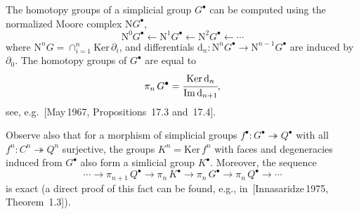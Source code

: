 \documentclass[oneside, 11pt]{amsart}
\begin{document}
The homotopy groups of a simplicial group $G^\bullet$ can be computed using the normalized Moore complex $\mathrm NG^\bullet$,
$$
\mathrm N^0G^\bullet\leftarrow\mathrm N^1G^\bullet\leftarrow\mathrm N^2G^\bullet\leftarrow\cdots
$$
where $\mathrm N^nG=\cap_{i=1}^n\mathrm{Ker}\,\partial_i$, and differentials $\mathrm d_n\colon\mathrm N^{n}G^\bullet\rightarrow\mathrm N^{n-1}G^\bullet$ are induced by $\partial_0$. The homotopy groups of $G^\bullet$ are equal to
$$
\pi_n\,G^\bullet = \cfrac{\mathrm{Ker}\,\mathrm d_n}{\mathrm{Im}\,\mathrm d_{n+1}},
$$
see, e.g.~[May\,1967, Propositions~17.3 and~17.4].

Observe also that for a morphism of simplicial groups $f^\bullet\colon G^\bullet\twoheadrightarrow Q^\bullet$ with all $f^n\colon C^n\twoheadrightarrow Q^n$ surjective, the groups $K^n=\mathrm{Ker}\,f^n$ with faces and degeneracies induced from $G^\bullet$ also form a simlicial group $K^\bullet$. Moreover, the sequence
$$
\cdots\rightarrow\pi_{n+1}\,Q^\bullet\rightarrow\pi_n\,K^\bullet\rightarrow\pi_n\,G^\bullet\rightarrow\pi_n\,Q^\bullet\rightarrow\cdots
$$
is exact (a direct proof of this fact can be found, e.g., in~[Innasaridze\,1975, Theorem~1.3]).
\end{document}
